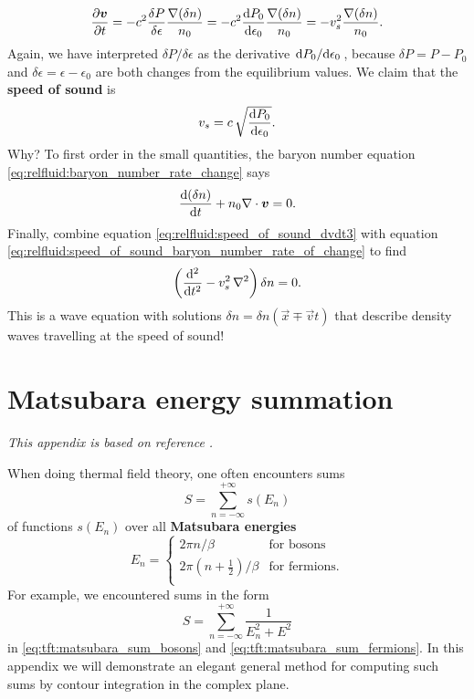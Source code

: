 \begin{equation}
	\pdv{\vec{v}}{t} = -c^2 \frac{\delta P}{\delta \epsilon} \frac{\nabla (\delta n)}{n_0}
	                 = -c^2 \odv{P_0}{\epsilon_0} \frac{\nabla (\delta n)}{n_0}
	                 = -v_s^2 \frac{\nabla (\delta n)}{n_0} .
\label{eq:relfluid:speed_of_sound_dvdt3}
\end{equation}
Again, we have interpreted $\delta P / \delta \epsilon$ as the derivative $\odv{P_0}/{\epsilon_0}$, because $\delta P = P - P_0$ and $\delta \epsilon = \epsilon - \epsilon_0$ are both changes from the equilibrium values.
We claim that the \textbf{speed of sound} is
\begin{equation}
	v_s = c \, \sqrt{\odv{P_0}{\epsilon_0}} .
\label{eq:relfluid:speed_of_sound}
\end{equation}
Why?
To first order in the small quantities, the baryon number equation \eqref{eq:relfluid:baryon_number_rate_change} says
\begin{equation}
	\odv{(\delta n)}{t} + n_0 \nabla \cdot \vec{v} = 0 .
\label{eq:relfluid:speed_of_sound_baryon_number_rate_of_change}
\end{equation}
Finally, combine equation \eqref{eq:relfluid:speed_of_sound_dvdt3} with equation \eqref{eq:relfluid:speed_of_sound_baryon_number_rate_of_change} to find
\begin{equation}
	\left( \odv[2]{}{t} - v_s^2 \, \nabla^2 \right) \delta n = 0 .
\end{equation}
This is a wave equation with solutions $\delta n = \delta n (\vec{x} \mp \vec{v} t)$ that describe density waves travelling at the speed of sound!


\chapter{Matsubara energy summation}
\label{chap:matsum}

\textit{This appendix is based on reference \cite{ref:altland_simons}.}

When doing thermal field theory, one often encounters sums
\begin{equation}
	S = \sum_{n=-\infty}^{+\infty} s(E_n)
\label{eq:matsum:sum}
\end{equation}
of functions $s(E_n)$ over all \textbf{Matsubara energies}
\begin{equation}
	E_n = \begin{cases}
	          2 \pi n / \beta                        & \text{for bosons}    \\
	          2 \pi \left( n+\frac12 \right) / \beta & \text{for fermions} .\\
	      \end{cases}
\end{equation}
For example, we encountered sums in the form
\begin{equation}
	S = \sum_{n=-\infty}^{+\infty} \frac{1}{E_n^2 + E^2}
\label{eq:matsum:motivating_example}
\end{equation}
in \cref{eq:tft:matsubara_sum_bosons} and \cref{eq:tft:matsubara_sum_fermions}.
In this appendix we will demonstrate an elegant general method for computing such sums by contour integration in the complex plane.

